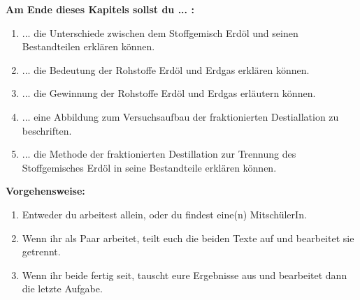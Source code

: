 \documentclass{scrartcl}  %
\begin{document}
\vspace{0.7cm}	
	\begin{minipage}{0.7\textwidth}
		\noindent \textbf{Am Ende dieses Kapitels sollst du ... :}
		\begin{enumerate}
			\item ... die Unterschiede zwischen dem Stoffgemisch Erdöl und seinen Bestandteilen erklären können.
			\item ... die Bedeutung der Rohstoffe Erdöl und Erdgas erklären können.
			\item ... die Gewinnung der Rohstoffe Erdöl und Erdgas erläutern können.
			\item ... eine Abbildung zum Versuchsaufbau der fraktionierten Destiallation zu beschriften.
			\item ... die Methode der fraktionierten Destillation zur Trennung des Stoffgemisches Erdöl in seine Bestandteile erklären können.
		\end{enumerate}
		\textbf{Vorgehensweise:}
		\begin{enumerate}
			\item Entweder du arbeitest allein, oder du findest eine(n) MitschülerIn.
			\item Wenn ihr als Paar arbeitet, teilt euch die beiden Texte auf und bearbeitet sie getrennt.
			\item Wenn ihr beide fertig seit, tauscht eure Ergebnisse aus und bearbeitet dann die letzte Aufgabe.
		\end{enumerate}
			
	\end{minipage}
	\hspace{0.1\textwidth}
\end{document}
